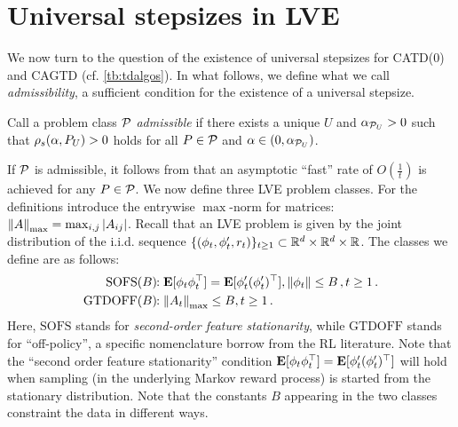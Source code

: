 \section{Universal stepsizes in LVE}\label{sec:rl}
We now turn to the question of the existence of universal stepsizes for CATD(0) and CAGTD (cf. \cref{tb:tdalgos}). 
In what follows, we define what we call \emph{admissibility}, 
a sufficient condition for the existence of a universal stepsize. 
\begin{definition}\label{def:admis}
Call a problem class $\P$ \emph{admissible} if there exists a unique $U$ and $\alpha_{\P_U}>0$ such that
$\rhos{P_U}>0$ holds for all $P\in \P$ and $\alpha\in(0,\alpha_{\P_U})$.
\end{definition}
If $\P$ is admissible, it  follows from  that an asymptotic ``fast'' rate of $O(\frac1t)$ is achieved for any $P\in \cP$. 
We now define three LVE problem classes. For the definitions introduce
the entrywise $\max$-norm for matrices: $\norm{A}_{\max} = \max_{i,j} |A_{ij}|$.
Recall that an LVE problem is given by the joint distribution of the i.i.d. sequence
$\{(\phi_t,\phi_t',r_t)\}_{t\ge 1}\subset \R^d\times \R^d \times \R$. 
The classes we define are as follows:
\begin{align*}
\text{SOFS}(B)&\!\!: \E[\phi_t\phi_t^\top]=\E[\phi'_t(\phi'_t)^\top], %
						\norm{\phi_t}\le B\,, t\ge 1\,.\\
\text{GTDOFF}(B)&\!\!:  \norm{A_t}_{\max} \le B, t\ge 1\,.
\end{align*}
Here, $\text{SOFS}$ stands for \emph{second-order feature stationarity}, while $\text{GTDOFF}$ stands for ``off-policy'', a specific nomenclature borrow from the RL literature.
Note that the ``second order feature stationarity'' condition $\E[\phi_t\phi_t^\top]=\E[\phi'_t(\phi'_t)^\top]$ will hold 
when sampling (in the underlying Markov reward process) 
is started from the stationary distribution. 
Note that the constants $B$ appearing in the two classes constraint the data in different ways.
\FloatBarrier
\begin{table}[h]
\caption{Here, $S,A,\gamma$ are fixed across all the class and the second column shows the quantities that vary across the respective classes. These three capture \emph{on/off-policy} learning scenarios arising in RL.}
\end{table}

